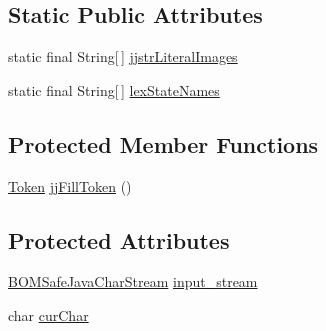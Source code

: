 \subsection*{Static Public Attributes}
\begin{DoxyCompactItemize}
\item 
static final String\mbox{[}$\,$\mbox{]} \hyperlink{classuk_1_1ac_1_1manchester_1_1cs_1_1owlapi_1_1dlsyntax_1_1parser_1_1_d_l_syntax_parser_token_manager_a66ca14c7d2c4bd55ee8e47d7897be89f}{jjstr\-Literal\-Images}
\item 
static final String\mbox{[}$\,$\mbox{]} \hyperlink{classuk_1_1ac_1_1manchester_1_1cs_1_1owlapi_1_1dlsyntax_1_1parser_1_1_d_l_syntax_parser_token_manager_a811c2b61ac8ed6ee71c226eec3f277a0}{lex\-State\-Names}
\end{DoxyCompactItemize}
\subsection*{Protected Member Functions}
\begin{DoxyCompactItemize}
\item 
\hyperlink{classuk_1_1ac_1_1manchester_1_1cs_1_1owlapi_1_1dlsyntax_1_1parser_1_1_token}{Token} \hyperlink{classuk_1_1ac_1_1manchester_1_1cs_1_1owlapi_1_1dlsyntax_1_1parser_1_1_d_l_syntax_parser_token_manager_ac856305bc76e9edb599665f103a5396b}{jj\-Fill\-Token} ()
\end{DoxyCompactItemize}
\subsection*{Protected Attributes}
\begin{DoxyCompactItemize}
\item 
\hyperlink{classuk_1_1ac_1_1manchester_1_1cs_1_1_b_o_m_safe_java_char_stream}{B\-O\-M\-Safe\-Java\-Char\-Stream} \hyperlink{classuk_1_1ac_1_1manchester_1_1cs_1_1owlapi_1_1dlsyntax_1_1parser_1_1_d_l_syntax_parser_token_manager_a8b1673520c92512a9e3423b82f6d1aa3}{input\-\_\-stream}
\item 
char \hyperlink{classuk_1_1ac_1_1manchester_1_1cs_1_1owlapi_1_1dlsyntax_1_1parser_1_1_d_l_syntax_parser_token_manager_a2213b83d3a807f2c67792a83681fb0ae}{cur\-Char}
\end{DoxyCompactItemize}
